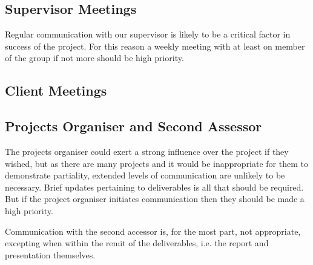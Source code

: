 \subsection{Supervisor Meetings}

Regular communication with our supervisor is likely to be a critical factor in success of the project. For this reason a weekly meeting with at least on member of the group if not more should be high priority.

\subsection{Client Meetings}

\subsection{Projects Organiser and Second Assessor}

The projects organiser could exert a strong influence over the project if they wished, but as there are many projects and it would be inappropriate for them to demonstrate partiality, extended levels of communication are unlikely to be necessary. Brief updates pertaining to deliverables is all that should be required. But if the project organiser initiates communication then they should be made a high priority.

Communication with the second accessor is, for the most part, not appropriate, excepting when within the remit of the deliverables, i.e. the report and presentation themselves.

